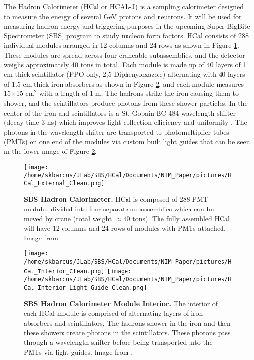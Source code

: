 \documentclass[oneside]{book}   %
\begin{document}
The Hadron Calorimeter (HCal or HCAL-J) is a sampling calorimeter designed to measure the energy of several GeV protons and neutrons. It will be used for measuring hadron energy and triggering purposes in the upcoming Super BigBite Spectrometer (SBS) program to study nucleon form factors. HCal consists of 288 individual modules arranged in 12 columns and 24 rows as shown in Figure \ref{fig:HCal}. These modules are spread across four craneable subassemblies, and the detector weighs approximately 40 tons in total. Each module is made up of 40 layers of 1 cm thick scintillator (PPO only, 2,5-Diphenyloxazole) alternating with 40 layers of 1.5 cm thick iron absorbers as shown in Figure \ref{fig:HCal_interior}, and each module measures 15$\times$15 cm$^2$ with a length of 1 m. The hadrons strike the iron causing them to shower, and the scintillators produce photons from these shower particles. In the center of the iron and scintillators is a St. Gobain BC-484 wavelength shifter (decay time 3 ns) which improves light collection efficiency and uniformity \cite{brio_2018}. The photons in the wavelength shifter are transported to photomultiplier tubes (PMTs) on one end of the modules via custom built light guides that can be seen in the lower image of Figure \ref{fig:HCal_interior}.\\

	\begin{figure}[!ht]
	\begin{center}
	\texttt{[image: /home/skbarcus/JLab/SBS/HCal/Documents/NIM\_Paper/pictures/HCal\_External\_Clean.png]}
	\end{center}
	\caption{
	{\bf{SBS Hadron Calorimeter.}} HCal is composed of 288 PMT modules divided into four separate subassemblies which can be moved by crane (total weight $\approx$40 tons). The fully assembled HCal will have 12 columns and 24 rows of modules with PMTs attached. Image from \cite{brio_2018}.}
	\label{fig:HCal}
	\end{figure}	
	
	\begin{figure}[!ht]
	\begin{center}
	\texttt{[image: /home/skbarcus/JLab/SBS/HCal/Documents/NIM\_Paper/pictures/HCal\_Interior\_Clean.png]}
	\texttt{[image: /home/skbarcus/JLab/SBS/HCal/Documents/NIM\_Paper/pictures/HCal\_Interior\_Light\_Guide\_Clean.png]}
	\end{center}
	\caption{
	{\bf{SBS Hadron Calorimeter Module Interior.}} The interior of each HCal module is comprised of alternating layers of iron absorbers and scintillators. The hadrons shower in the iron and then these showers create photons in the scintillators. These photons pass through a wavelength shifter before being transported into the PMTs via light guides. Image from \cite{brio_2018}.}
	\label{fig:HCal_interior}
	\end{figure}	
\end{document}
